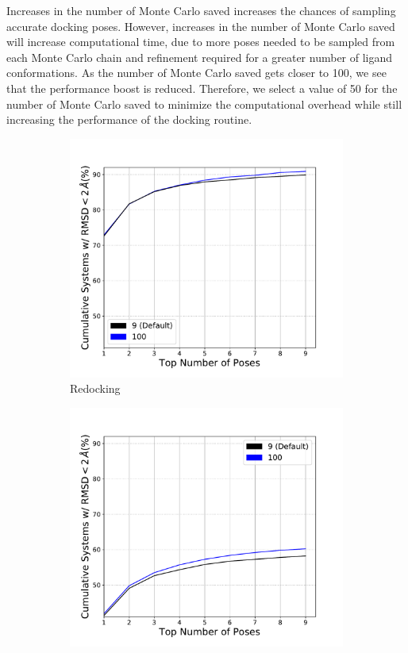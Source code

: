 \documentclass[journal=jcisd8,manuscript=article]{achemso}
\begin{document}
Increases in the number of Monte Carlo saved increases the chances of sampling accurate docking poses. However, increases in the number of Monte Carlo saved will increase computational time, due to more poses needed to be sampled from each Monte Carlo chain and refinement required for a greater number of ligand conformations. As the number of Monte Carlo saved gets closer to 100, we see that the performance boost is reduced. Therefore, we select a value of 50 for the number of Monte Carlo saved to minimize the computational overhead while still increasing the performance of the docking routine.  

\begin{figure}    
        \begin{subfigure}[b]{0.48\textwidth}    
		\centering
		\includegraphics[width=\textwidth]{figures/redocking/sweep_num_modes_line.pdf}
		\caption{Redocking}
		\label{fig:num modes rd}
        \end{subfigure}    
        \begin{subfigure}[b]{0.48\textwidth}    
		\centering
		\includegraphics[width=\textwidth]{figures/crossdocking/sweep_num_modes_line.pdf}

\end{subfigure}
\end{figure}
\end{document}
